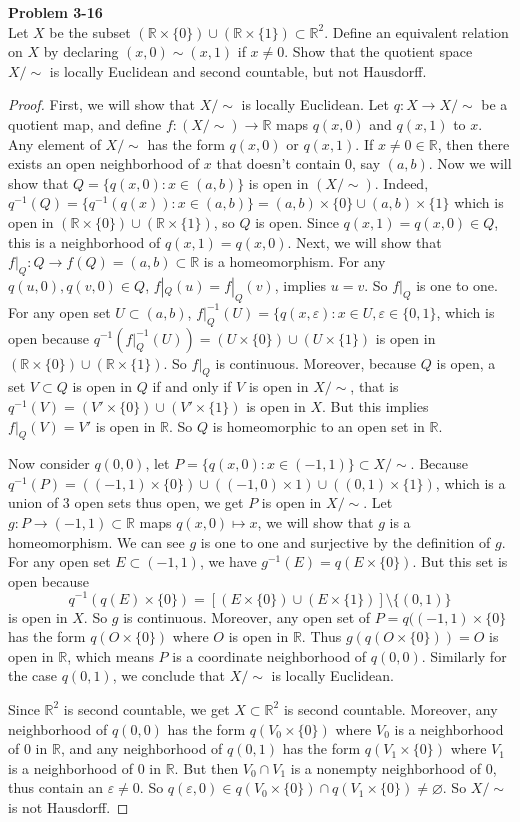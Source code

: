 \documentclass[12pt, a4paper]{article}
\theoremstyle{plain}
\newcommand{\R}{\mathbb{R}}
\def\epsilon{\varepsilon}
\newenvironment{problem}[2][Problem]
    { \begin{mdframed}[backgroundcolor=gray!20] \textbf{#1 #2} \\}
    {  \end{mdframed}}
\begin{document}
\begin{problem}{3-16}
Let $X$ be the subset $(\R\times \{0\})\cup (\R\times \{1\})\subset \R^2$. Define an equivalent relation on $X$ by declaring $(x,0)\sim (x,1)$ if $x\neq 0$. Show that the quotient space $X/\sim$ is locally Euclidean and second countable, but not Hausdorff.
\end{problem}
	\begin{proof}
	First, we will show that $X/\sim$ is locally Euclidean. Let $q: X\rightarrow X/\sim$ be a quotient map, and define $f:(X/\sim) \rightarrow \R$ maps $q(x,0)$ and $q(x,1)$ to $x$. Any element of $X/\sim$ has the form $q(x,0)$ or $q(x,1)$. If $x\neq 0\in \R$, then there exists an open neighborhood of $x$ that doesn't contain $0$, say $(a,b)$. Now we will show that $Q=\{q(x,0):x\in (a,b)\}$ is open in $(X/\sim)$. Indeed, $q^{-1}(Q)=\{q^{-1}(q(x)):x\in (a,b)\}=(a,b)\times\{0\}\cup (a,b)\times \{1\}$ which is open in $(\R\times \{0\})\cup (\R\times \{1\})$, so $Q$ is open. Since $q(x,1)=q(x,0)\in Q$, this is a neighborhood of $q(x,1)=q(x,0)$. Next, we will show that $f|_Q:Q\rightarrow f(Q)=(a,b)\subset \R$ is a homeomorphism. For any $q(u,0),q(v,0)\in Q$, $f|_Q(u)=f|_Q(v)$, implies $u=v$. So $f|_Q$ is one to one. For any open set $U\subset (a,b)$, $f|_Q^{-1}(U)= \{q(x,\epsilon):x\in U, \epsilon\in\{0,1\}$, which is open because $q^{-1}(f|_Q^{-1}(U))=(U\times\{0\})\cup (U\times\{1\})$ is open in $(\R\times \{0\})\cup (\R\times \{1\})$. So $f|_Q$ is continuous. Moreover, because $Q$ is open, a set $V\subset Q$ is open in $Q$ if and only if $V$ is open in $X/\sim$, that is $q^{-1}(V)=(V'\times \{0\})\cup (V'\times \{1\})$ is open in $X$. But this implies $f|_Q(V)=V'$ is open in $\R$. So $Q$ is homeomorphic to an open set in $\R$.
	
	Now consider $q(0,0)$, let $P=\{q(x,0):x\in (-1,1)\}\subset X/\sim$. Because $q^{-1}(P)=((-1,1)\times\{0\})\cup ((-1,0)\times 1)\cup((0,1)\times \{1\})$, which is a union of 3 open sets thus open, we get $P$ is open in $X/\sim$. Let $g:P\rightarrow (-1,1)\subset \R$ maps $q(x,0)\mapsto x$, we will show that $g$ is a homeomorphism. We can see $g$ is one to one and surjective by the definition of $g$. For any open set $E\subset (-1,1)$, we have $g^{-1}(E)=q(E\times\{0\})$. But this set is open because 
	\[
	q^{-1}(q(E)\times\{0\})=[(E\times\{0\})\cup (E\times\{1\})]\setminus \{(0,1)\}
	\]
	is open in $X$. So $g$ is continuous. Moreover, any open set of $P=q((-1,1)\times \{0\}$ has the form $q(O\times \{0\})$ where $O$ is open in $\R$. Thus $g(q(O\times \{0\}))=O$ is open in $\R$, which means $P$ is a coordinate neighborhood of $q(0,0)$. Similarly for the case $q(0,1)$, we conclude that $X/\sim$ is locally Euclidean.
	
	Since $\R^2$ is second countable, we get $X\subset \R^2$ is second countable. Moreover, any neighborhood of $q(0,0)$ has the form $q(V_0\times \{0\})$ where $V_0$ is a neighborhood of $0$ in $\R$, and any neighborhood of $q(0,1)$ has the form $q(V_1\times \{0\})$ where $V_1$ is a neighborhood of $0$ in $\R$. But then $V_0\cap V_1$ is a nonempty neighborhood of $0$, thus contain an $\epsilon\neq 0$. So $q(\epsilon,0)\in  q(V_0\times \{0\})\cap q(V_1\times \{0\})\neq \varnothing$. So $X/\sim$ is not Hausdorff.
	\end{proof}
\end{document}
